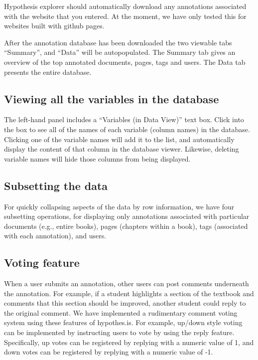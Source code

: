 \documentclass[]{book}
\theoremstyle{definition}
\theoremstyle{definition}
\theoremstyle{definition}
\theoremstyle{remark}
\begin{document}
Hypothesis explorer should automatically download any annotations
associated with the website that you entered. At the moment, we have
only tested this for websites built with github pages.

After the annotation database has been downloaded the two viewable tabs
``Summary'', and ``Data'' will be autopopulated. The Summary tab gives
an overview of the top annotated documents, pages, tags and users. The
Data tab presents the entire database.

\subsection{Viewing all the variables in the
database}\label{viewing-all-the-variables-in-the-database}

The left-hand panel includes a ``Variables (in Data View)'' text box.
Click into the box to see all of the names of each variable (column
names) in the database. Clicking one of the variable names will add it
to the list, and automatically display the content of that column in the
database viewer. Likewise, deleting variable names will hide those
columns from being displayed.

\subsection{Subsetting the data}\label{subsetting-the-data}

For quickly collapsing aspects of the data by row information, we have
four subsetting operations, for displaying only annotations associated
with particular documents (e.g., entire books), pages (chapters within a
book), tags (associated with each annotation), and users.

\subsection{Voting feature}\label{voting-feature}

When a user submits an annotation, other users can post comments
underneath the annotation. For example, if a student highlights a
section of the textbook and comments that this section should be
improved, another student could reply to the original comment. We have
implemented a rudimentary comment voting system using these features of
hypothes.is. For example, up/down style voting can be implemented by
instructing users to vote by using the reply feature. Specifically, up
votes can be registered by replying with a numeric value of 1, and down
votes can be registered by replying with a numeric value of -1.
\end{document}
